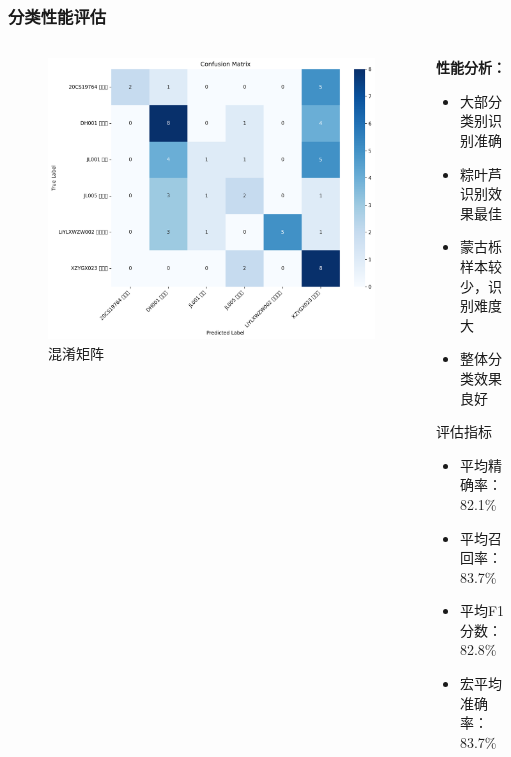 \documentclass[12pt]{beamer}
\begin{document}
\begin{frame}
\frametitle{分类性能评估}
\begin{columns}
\begin{column}{0.5\textwidth}
\begin{figure}
\centering
\includegraphics[width=\textwidth]{confusion_matrix.png}
\caption{混淆矩阵}
\end{figure}
\end{column}

\begin{column}{0.5\textwidth}
\textbf{性能分析：}
\begin{itemize}
    \item 大部分类别识别准确
    \item 粽叶芦识别效果最佳
    \item 蒙古栎样本较少，识别难度大
    \item 整体分类效果良好
\end{itemize}

\vspace{0.3cm}
\begin{block}{评估指标}
\small
\begin{itemize}
    \item 平均精确率：82.1\%
    \item 平均召回率：83.7\%
    \item 平均F1分数：82.8\%
    \item 宏平均准确率：83.7\%
\end{itemize}
\end{block}
\end{column}
\end{columns}
\end{frame}
\end{document}
